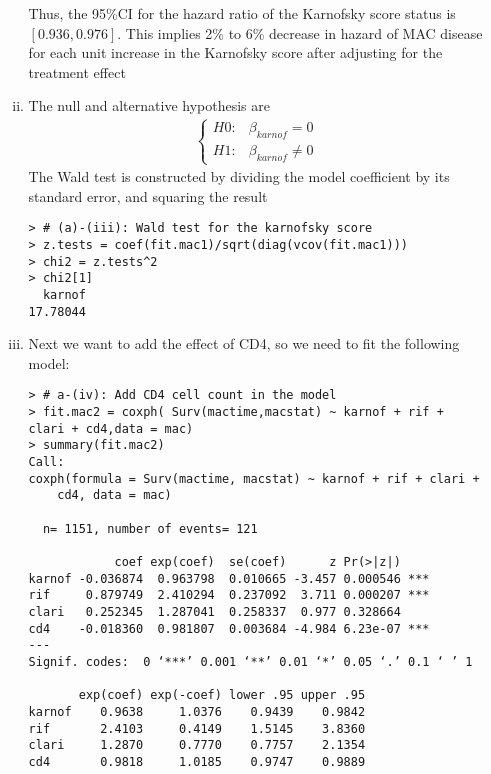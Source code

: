 \begin{enumerate}[(a)]
\begin{enumerate}[(i)]
\begin{footnotesize}
\end{footnotesize}
Thus, the 95\%CI for the hazard ratio of the Karnofsky score status is $[0.936,0.976]$. This 
implies 2\% to 6\% decrease in hazard of MAC disease for each unit increase in the 
Karnofsky score after adjusting for the treatment effect
\item The null and 
alternative hypothesis are
\begin{align}
\begin{cases}
H0: & \beta_{karnof} = 0 \\
H1: & \beta_{karnof} \neq 0
\end{cases}\nonumber
\end{align}
The Wald test is constructed by dividing the model coefficient by its standard error, and squaring the result
\begin{footnotesize}
\begin{verbatim}
> # (a)-(iii): Wald test for the karnofsky score
> z.tests = coef(fit.mac1)/sqrt(diag(vcov(fit.mac1)))
> chi2 = z.tests^2
> chi2[1]
  karnof 
17.78044
\end{verbatim}
\end{footnotesize}
\item Next we want to add the effect of CD4, so we need to fit the following model:
\begin{footnotesize}
\begin{verbatim}
> # a-(iv): Add CD4 cell count in the model
> fit.mac2 = coxph( Surv(mactime,macstat) ~ karnof + rif + clari + cd4,data = mac)
> summary(fit.mac2)
Call:
coxph(formula = Surv(mactime, macstat) ~ karnof + rif + clari + 
    cd4, data = mac)

  n= 1151, number of events= 121 

            coef exp(coef)  se(coef)      z Pr(>|z|)    
karnof -0.036874  0.963798  0.010665 -3.457 0.000546 ***
rif     0.879749  2.410294  0.237092  3.711 0.000207 ***
clari   0.252345  1.287041  0.258337  0.977 0.328664    
cd4    -0.018360  0.981807  0.003684 -4.984 6.23e-07 ***
---
Signif. codes:  0 ‘***’ 0.001 ‘**’ 0.01 ‘*’ 0.05 ‘.’ 0.1 ‘ ’ 1

       exp(coef) exp(-coef) lower .95 upper .95
karnof    0.9638     1.0376    0.9439    0.9842
rif       2.4103     0.4149    1.5145    3.8360
clari     1.2870     0.7770    0.7757    2.1354
cd4       0.9818     1.0185    0.9747    0.9889


\end{verbatim}
\end{footnotesize}
\end{enumerate}
\end{enumerate}
